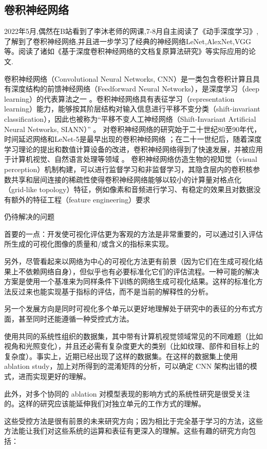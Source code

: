 \documentclass{article}
\begin{document}
\subsection{卷积神经网络}
2022年5月,偶然在B站看到了李沐老师的网课,7-8月自主阅读了《动手深度学习》\citep{dssdxx},了解到了卷积神经网络,并且进一步学习了经典的神经网络LeNet,AlexNet,VGG等。阅读了诸如《基于深度卷积神经网络的文档复原算法研究》\citep{jjsjwl}等实际应用的论文.

卷积神经网络（Convolutional Neural Networks, CNN）是一类包含卷积计算且具有深度结构的前馈神经网络（Feedforward Neural Networks），是深度学习（deep learning）的代表算法之一 。卷积神经网络具有表征学习（representation learning）能力，能够按其阶层结构对输入信息进行平移不变分类（shift-invariant classification），因此也被称为“平移不变人工神经网络（Shift-Invariant Artificial Neural Networks, SIANN）”   。
对卷积神经网络的研究始于二十世纪80至90年代，时间延迟网络和LeNet-5是最早出现的卷积神经网络  ；在二十一世纪后，随着深度学习理论的提出和数值计算设备的改进，卷积神经网络得到了快速发展，并被应用于计算机视觉、自然语言处理等领域  。
卷积神经网络仿造生物的视知觉（visual perception）机制构建，可以进行监督学习和非监督学习，其隐含层内的卷积核参数共享和层间连接的稀疏性使得卷积神经网络能够以较小的计算量对格点化（grid-like topology）特征，例如像素和音频进行学习、有稳定的效果且对数据没有额外的特征工程（feature engineering）要求

仍待解决的问题

首要的一点：开发使可视化评估更为客观的方法是非常重要的，可以通过引入评估所生成的可视化图像的质量和/或含义的指标来实现。\par
另外，尽管看起来以网络为中心的可视化方法更有前景（因为它们在生成可视化结果上不依赖网络自身），但似乎也有必要标准化它们的评估流程。一种可能的解决方案是使用一个基准来为同样条件下训练的网络生成可视化结果。这样的标准化方法反过来也能实现基于指标的评估，而不是当前的解释性的分析。\par
另一个发展方向是同时可视化多个单元以更好地理解处于研究中的表征的分布式方面，甚至同时还能遵循一种受控式方法。\par
使用共同的系统性组织的数据集，其中带有计算机视觉领域常见的不同难题（比如视角和光照变化），并且还必需有复杂度更大的类别（比如纹理、部件和目标上的复杂度）。事实上，近期已经出现了这样的数据集。在这样的数据集上使用 ablation study，加上对所得到的混淆矩阵的分析，可以确定 CNN 架构出错的模式，进而实现更好的理解。\par
此外，对多个协同的 ablation 对模型表现的影响方式的系统性研究是很受关注的。这样的研究应该能延伸我们对独立单元的工作方式的理解。\par
这些受控方法是很有前景的未来研究方向；因为相比于完全基于学习的方法，这些方法能让我们对这些系统的运算和表征有更深入的理解。这些有趣的研究方向包括：\par
\end{document}
